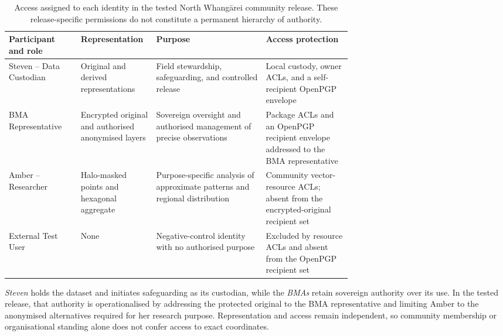 \documentclass[]{interact}
\begin{document}
\begin{table}[h!]
\centering
\caption{Access assigned to each identity in the tested North Whangārei community release. These release-specific permissions do not constitute a permanent hierarchy of authority.}
\label{tab:disclosure-decisions}
\small
\begin{tabularx}{\linewidth}{>{\raggedright\arraybackslash}p{0.21\linewidth}>{\raggedright\arraybackslash}p{0.22\linewidth}>{\raggedright\arraybackslash}X>{\raggedright\arraybackslash}p{0.25\linewidth}}
\toprule
\textbf{Participant and role} & \textbf{Representation} & \textbf{Purpose} & \textbf{Access protection} \\
\midrule
Steven -- Data Custodian & Original and derived representations & Field stewardship, safeguarding, and controlled release & Local custody, owner ACLs, and a self-recipient OpenPGP envelope \\
 BMA Representative & Encrypted original and authorised anonymised layers & Sovereign oversight and authorised management of precise observations & Package ACLs and an OpenPGP recipient envelope addressed to the BMA representative \\
 Amber -- Researcher & Halo-masked points and hexagonal aggregate & Purpose-specific analysis of approximate patterns and regional distribution & Community vector-resource ACLs; absent from the encrypted-original recipient set \\
External Test User & None & Negative-control identity with no authorised purpose & Excluded by resource ACLs and absent from the OpenPGP recipient set \\
\bottomrule
\end{tabularx}
\end{table}

\textit{Steven} holds the dataset and initiates safeguarding as its custodian, while the \textit{BMAs} retain sovereign authority over its use. In the tested release, that authority is operationalised by addressing the protected original to the BMA representative and limiting Amber to the anonymised alternatives required for her research purpose. Representation and access remain independent, so community membership or organisational standing alone does not confer access to exact coordinates.
\end{document}

